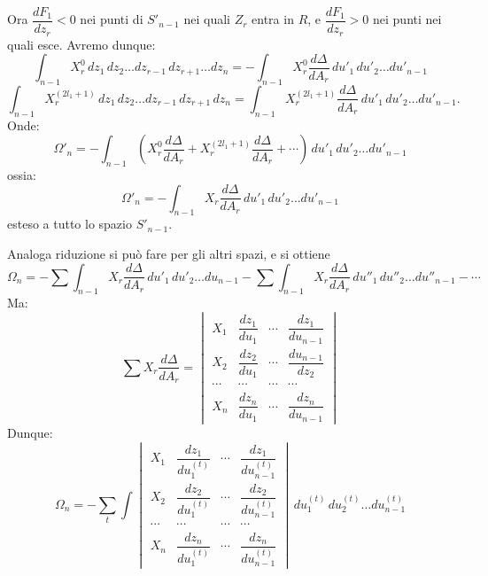 \documentclass{article}
\begin{document}
Ora $\dfrac{dF_{1}}{dz_{r}} < 0$ nei punti di $S'_{n-1}$ nei quali $Z_{r}$ entra in $R$, e $\dfrac{dF_{1}}{dz_{r}} > 0$ nei punti nei quali esce. Avremo dunque:
\[ \int_{n-1} X_{r}^{0}\,dz_{1}\,dz_{2}\ldots dz_{r-1}\,dz_{r+1}\ldots dz_{n} = - \int_{n-1} X_{r}^{0} \frac{d\Delta}{dA_{r}}\,du'_{1}\,du'_{2}\ldots du'_{n-1} \]
\[ \int_{n-1} X_{r}^{(2l_{1}+1)}\,dz_{1}\,dz_{2}\ldots dz_{r-1}\,dz_{r+1}\,dz_{n} = \int_{n-1} X_{r}^{(2l_{1}+1)} \frac{d\Delta}{dA_{r}}\,du'_{1}\,du'_{2}\ldots du'_{n-1}. \]
Onde:
\[ \Omega'_{n} = - \int_{n-1} \left( X_{r}^{0} \frac{d\Delta}{dA_{r}} + X_{r}^{(2l_{1}+1)} \frac{d\Delta}{dA_{r}} + \cdots \right)\,du'_{1}\,du'_{2}\ldots du'_{n-1} \]
ossia:
\[ \Omega'_{n} = - \int_{n-1} X_{r} \frac{d\Delta}{dA_{r}}\,du'_{1}\,du'_{2}\ldots du'_{n-1} \]
esteso a tutto lo spazio $S'_{n-1}$.


Analoga riduzione si può fare per gli altri spazi, e si ottiene
\[ \Omega_{n} = - \sum \int_{n-1} X_{r} \frac{d\Delta}{dA_{r}}\,du'_{1}\,du'_{2}\ldots du_{n-1} - \sum \int_{n-1} X_{r} \frac{d\Delta}{dA_{r}}\,du''_{1}\,du''_{2}\ldots du''_{n-1} - \cdots \]
Ma:
\[ \sum X_{r} \frac{d\Delta}{dA_{r}} = \begin{vmatrix} X_{1} & \dfrac{dz_{1}}{du_{1}} & \cdots & \dfrac{dz_{1}}{du_{n-1}} \\ X_{2} & \dfrac{dz_{2}}{du_{1}} & \cdots & \dfrac{du_{n-1}}{dz_{2}} \\ \cdots & \cdots & \cdots & \cdots \\ X_{n} & \dfrac{dz_{n}}{du_{1}} & \cdots & \dfrac{dz_{n}}{du_{n-1}} \end{vmatrix} \]
Dunque:
\[ \Omega_{n} = - \sum_{t} \int \begin{vmatrix} X_{1} & \dfrac{dz_{1}}{du^{(t)}_{1}} & \cdots & \dfrac{dz_{1}}{du^{(t)}_{n-1}} \\ X_{2} & \dfrac{dz_{2}}{du^{(t)}_{1}} & \cdots & \dfrac{dz_{2}}{du^{(t)}_{n-1}} \\ \cdots & \cdots & \cdots & \cdots \\ X_{n} & \dfrac{dz_{n}}{du^{(t)}_{1}} & \cdots & \dfrac{dz_{n}}{du^{(t)}_{n-1}} \end{vmatrix}\,du^{(t)}_{1}\,du^{(t)}_{2}\ldots du^{(t)}_{n-1} \tag{3} \]
\end{document}
